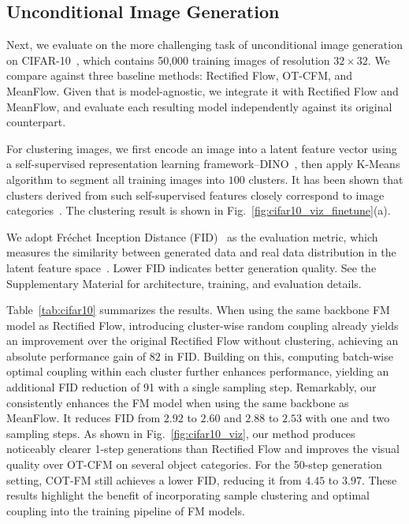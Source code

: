 \subsection{Unconditional Image Generation}

Next, we evaluate \method{} on the more challenging task of unconditional image generation on CIFAR-10~\cite{krizhevsky2009learning}, which contains 50,000 training images of resolution $32 \times 32$.  We compare \method{} against three baseline methods: Rectified Flow, OT-CFM, and MeanFlow. Given that \method{} is model-agnostic, we integrate it with Rectified Flow and MeanFlow, and evaluate each resulting model independently against its original counterpart.

For clustering images, we first encode an image into a latent feature vector using a self-supervised representation learning framework--DINO~\cite{caron2021emergingpropertiesselfsupervisedvision}, then apply K-Means algorithm to segment all training images into $100$ clusters.  It has been shown that clusters derived from such self-supervised features closely correspond to image categories~\cite{wu2018unsupervised,oquab2023dinov2}. The clustering result is shown in Fig.~\ref{fig:cifar10_viz_finetune}(a).

We adopt Fréchet Inception Distance (FID)~\cite{heusel2018ganstrainedtimescaleupdate} as the evaluation metric, which measures the similarity between generated data and real data distribution in the latent feature space~\cite{szegedy2015going}.  Lower FID indicates better generation quality. See the Supplementary Material for architecture, training, and evaluation details.

Table~\ref{tab:cifar10} summarizes the results. When using the same backbone FM model as Rectified Flow, introducing cluster-wise random coupling already yields an improvement over the original Rectified Flow without clustering, achieving an absolute performance gain of $82$ in FID.  Building on this, computing batch-wise optimal coupling within each cluster further enhances performance, yielding an additional FID reduction of 91 with a single sampling step.  Remarkably, our \method{} consistently enhances the FM model when using the same backbone as MeanFlow.  It reduces FID from $2.92$ to $2.60$ and $2.88$ to $2.53$ with one and two sampling steps. As shown in Fig.~\ref{fig:cifar10_viz}, our method produces noticeably clearer 1-step generations than Rectified Flow and improves the visual quality over OT-CFM on several object categories. For the 50-step generation setting, COT-FM still achieves a lower FID, reducing it from $4.45$ to $3.97$. These results highlight the benefit of incorporating sample clustering and optimal coupling into the training pipeline of FM models.

